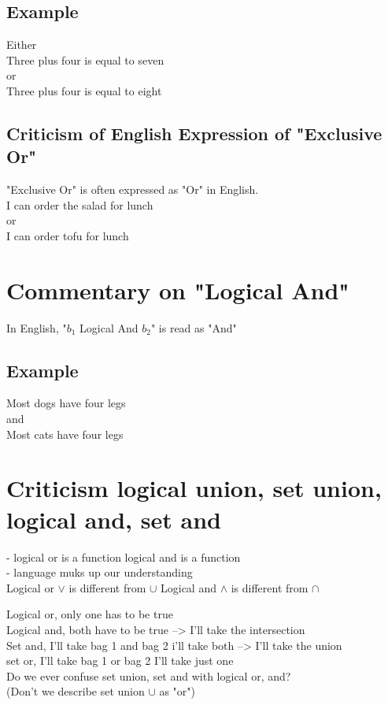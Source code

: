 \documentclass[11pt]{article}
\begin{document}
\subsection{Example}
Either\\
Three plus four is equal to seven\\
or\\
Three plus four is equal to eight
\subsection{Criticism of English Expression of "Exclusive Or"}
"Exclusive Or" is often expressed as "Or" in English.\\
I can order the salad for lunch\\
or\\
I can order tofu for lunch

\section{Commentary on "Logical And"}
In English, "$b_1$ Logical And $b_2$" is read as "And"
\subsection{Example}
Most dogs have four legs\\
and\\
Most cats have four legs


\section{Criticism logical union, set union, logical and, set and}
- logical or is a function logical and is a function\\
- language muks up our understanding\\

Logical or $\lor$ is different from $\cup$
Logical and $\land$ is different from $\cap$

Logical or, only one has to be true\\
Logical and, both have to be true --> I'll take the intersection\\

Set and, I'll take bag 1 and bag 2 i'll take both --> I'll take the union\\
set or, I'll take bag 1 or bag 2 I'll take just one\\

Do we ever confuse set union, set and with logical or, and?\\
(Don't we describe set union $\cup$ as "or")
\end{document}
